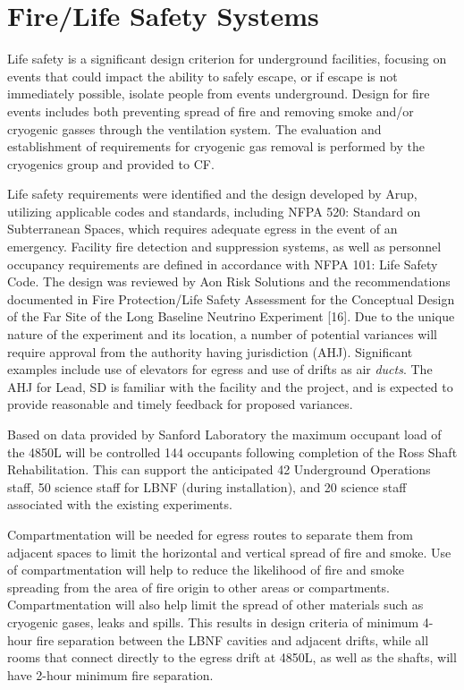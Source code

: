 \section{Fire/Life Safety Systems }
\label{sec:fscf-und-fire}

Life safety is a significant design criterion for underground facilities, focusing on events that could impact the ability to safely escape, or if escape is not immediately possible, isolate people from events underground. Design for fire events includes both preventing spread of fire and removing smoke and/or cryogenic gasses through the ventilation system. The evaluation and establishment of requirements for cryogenic gas removal is performed by the cryogenics group and provided to CF.

Life safety requirements were identified and the design developed by Arup, utilizing applicable codes and standards, including NFPA 520: Standard on Subterranean Spaces, which requires adequate egress in the event of an emergency. Facility fire detection and suppression systems, as well as personnel occupancy requirements are defined in accordance with NFPA 101: Life Safety Code. The design was reviewed by Aon Risk Solutions and the recommendations documented in Fire Protection/Life Safety Assessment for the Conceptual Design of the Far Site of the Long Baseline Neutrino Experiment [16]. Due to the unique nature of the experiment and its location, a number of potential variances will require approval from the authority having jurisdiction (AHJ).  Significant examples include use of elevators for egress and use of drifts as air \textit{ducts}.  The AHJ for Lead, SD is familiar with the facility and the project, and is expected to provide reasonable and timely feedback for proposed variances.

Based on data provided by Sanford Laboratory the maximum occupant load of the 4850L will be controlled 144 occupants following completion of the Ross Shaft Rehabilitation. This can support the anticipated 42 Underground Operations staff, 50 science staff for LBNF (during installation), and 20 science staff associated with the existing experiments. 

Compartmentation will be needed for egress routes to separate them from adjacent spaces to limit the horizontal and vertical spread of fire and smoke. Use of compartmentation will help to reduce the likelihood of fire and smoke spreading from the area of fire origin to other areas or compartments. Compartmentation will also help limit the spread of other materials such as cryogenic gases, leaks and spills. This results in design criteria of minimum 4-hour fire separation between the LBNF cavities and adjacent drifts, while all rooms that connect directly to the egress drift at 4850L, as well as the shafts, will have 2-hour minimum fire separation.

